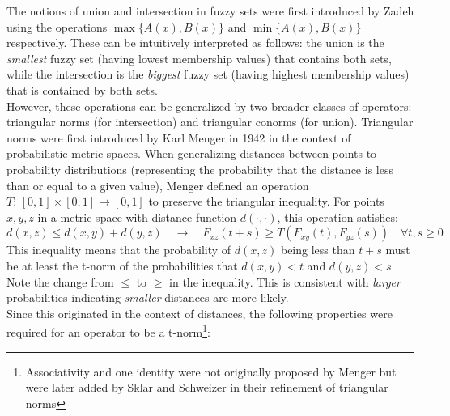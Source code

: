 The notions of union and intersection in fuzzy sets were first introduced by Zadeh \cite{Zadeh1965} using the operations $\max\{A(x),B(x)\}$ and $\min\{A(x),B(x)\}$ respectively. These can be intuitively interpreted as follows: the union is the \textit{smallest} fuzzy set (having lowest membership values) that contains both sets, while the intersection is the \textit{biggest} fuzzy set (having highest membership values) that is contained by both sets.\\
However, these operations can be generalized by two broader classes of operators: triangular norms (for intersection) and triangular conorms (for union).
Triangular norms were first introduced by Karl Menger in 1942 \cite{OriginTNorms} in the context of probabilistic metric spaces. When generalizing distances between points to probability distributions (representing the probability that the distance is less than or equal to a given value), Menger defined an operation $T:\,[0,1]\times [0,1]\to [0,1]$ to preserve the triangular inequality. For points $x,y,z$ in a metric space with distance function $d(\cdot,\cdot)$, this operation satisfies:
\begin{equation}\label{eq:Ftriangle_inequality_user}
d(x, z) \leq d(x, y) + d(y, z) \quad \longrightarrow \quad F_{xz}(t + s) \geq T(F_{xy}(t), F_{yz}(s)) \quad \forall t,s \geq 0
\end{equation}
This inequality means that the probability of $d(x,z)$ being less than $t+s$ must be at least the t-norm of the probabilities that $d(x,y)<t$ and $d(y,z)<s$. Note the change from $\leq$ to $\geq$ in the inequality. This is consistent with \textit{larger} probabilities indicating \textit{smaller} distances are more likely.\\
Since this originated in the context of distances, the following properties were required for an operator to be a t-norm\footnote{Associativity and one identity were not originally proposed by Menger but were later added by Sklar and Schweizer \cite{Sklar1983} in their refinement of triangular norms}:
